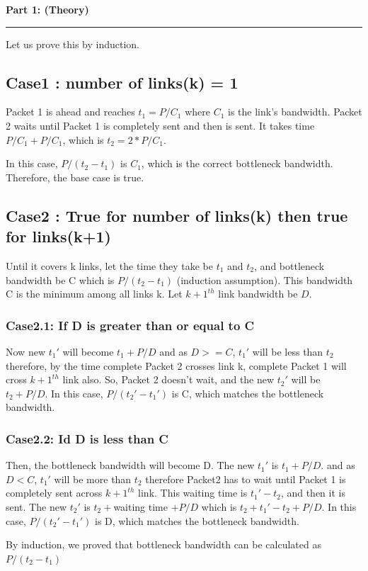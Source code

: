 \documentclass[a4paper,12pt]{article}
\title{\cooltitle{CS378 Lab-5 Report}}
\author{
    {\bf Saksham Rathi (22B1003)} \\ 
    Department of Computer Science, IIT Bombay \\ 
    \and
    {\bf Nandan Manjunath (22B0920)} \\ 
    Department of Computer Science, IIT Bombay
}
\date{}
\newenvironment{solution}[2][]{%
    \begin{mdframed}[linecolor=blue!70!black, linewidth=2pt, roundcorner=10pt, backgroundcolor=yellow!10!white, skipabove=12pt, skipbelow=12pt]%
        \textbf{\large #2}
        \par\noindent\rule{\textwidth}{0.4pt}
}{
    \end{mdframed}
}
\begin{document}
\maketitle
\begin{solution}{Part 1: (Theory) }
    Let us prove this by induction.
    \subsection*{Case1 : number of links(k) = 1}
    Packet 1 is ahead and reaches $t_1=P/C_1$ where $C_1$ is the link's bandwidth. Packet 2 waits until Packet 1 is completely sent and then is sent. It takes time $P/C_1+P/C_1$, which is $t_2=2*P/C_1$. 

    In this case, $P/(t_2-t_1)$ is $C_1$, which is the correct bottleneck bandwidth. Therefore, the base case is true.

    \subsection*{Case2 : True for number  of links(k) then true for links(k+1)}
    Until it covers k links, let the time they take be $t_1$ and $t_2$, and bottleneck bandwidth be C which is $P/(t_2-t_1)$ (induction assumption). This bandwidth C is the minimum among all links k. Let  ${k+1}^{th}$ link bandwidth be $D$.
    \subsubsection*{Case2.1: If D is greater than or equal to C}
    Now new $t_1'$ will become $t_1+P/D$ and as $D>=C$, $t_1'$ will be less than $t_2$ therefore, by the time complete Packet 2 crosses link k, complete Packet 1 will cross  ${k+1}^{th}$ link also. So, Packet 2 doesn't wait, and the new $t_2'$ will be $t_2+P/D$. In this case, $P/(t_2'-t_1')$ is C, which matches the bottleneck bandwidth.
    \subsubsection*{Case2.2: Id D is less than C}
    Then, the bottleneck bandwidth will become D. The new $t_1'$ is $t_1+P/D$.
    and as $D<C$, $t_1'$ will be more than $t_2$ therefore Packet2 has to wait until Packet 1 is completely sent across  ${k+1}^{th}$ link. This waiting time is $t_1'-t_2$, and then it is sent. The new $t_2'$ is $t_2+$waiting time $+P/D$ which is $t_2+t_1'-t_2+P/D$. In this case, $P/(t_2'-t_1')$ is D, which matches the bottleneck bandwidth.

    By induction, we proved that bottleneck bandwidth can be calculated as $P/(t_2-t_1)$
\end{solution}
\end{document}
